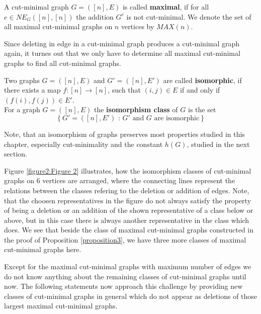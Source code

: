 \begin{defi}
A cut-minimal graph \(G=([n],E)\) is called \textbf{maximal}, if for all\\
\(e\in NE_G([n],[n])\) the addition \(G^e\) is not cut-minimal. We denote the set of all maximal cut-minimal graphs on \(n\) vertices by \(MAX(n)\).
\end{defi}
Since deleting in edge in a cut-minimal graph produces a cut-minimal graph again, it turnes out that we only have to determine all maximal cut-minimal graphs to find all cut-minimal graphs.
\begin{defi}
Two graphs \(G=([n],E)\) and \(G'=([n],E')\) are called \textbf{isomorphic}, if there exists a map \(f:[n]\rightarrow [n]\), such that \((i,j)\in E\) if and only if \((f(i),f(j))\in E'\).\\
For a graph \(G=([n],E)\) the \textbf{isomorphism class} of \(G\) is the set
\[
\left\{G'=([n],E')\text{ : }G'\text{ and }G\text{ are isomorphic}\right\}
\]
\end{defi}

\begin{rem}
Note, that an isomorphism of graphs preserves most properties studied in this chapter, especially cut-minimality and the constant \(h(G)\), studied in the next section.
\end{rem}

Figure \ref{figure2:Figure 2} illustrates, how the isomorphism classes of cut-minimal graphs on \(6\) vertices are arranged, where the connecting lines represent the relations between the classes refering to the deletion or addition of edges. Note, that the choosen representatives in the figure do not always satisfy the property of being a deletion or an addition of the shown representative of a class below or above, but in this case there is always another representative in the class which does. We see that beside the class of maximal cut-minimal graphs constructed in the proof of Proposition \ref{proposition3}, we have three more classes of maximal cut-minimal graphs here.

\newpage



Except for the maximal cut-minimal graphs with maximum number of edges we do not know anything about the remaining classes of cut-minimal graphs until now. The following statements now approach this challenge by providing new classes of cut-minimal graphs in general which do not appear as deletions of those largest maximal cut-minimal graphs.

